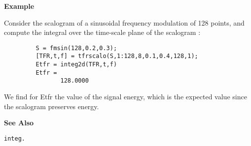 {\bf \large \sf Example}\\
\hspace*{1.5cm}
\begin{minipage}[t]{13.5cm}
Consider the scalogram of a sinusoidal frequency modulation of 128 points,
and compute the integral over the time-scale plane of the scalogram :
\begin{verbatim}
         S = fmsin(128,0.2,0.3);
         [TFR,t,f] = tfrscalo(S,1:128,8,0.1,0.4,128,1);
         Etfr = integ2d(TFR,t,f)
         Etfr = 
                128.0000
\end{verbatim}
We find for {\ty Etfr} the value of the signal energy, which is the
expected value since the scalogram preserves energy.
\end{minipage}
\vspace*{.5cm}


{\bf \large \sf See Also}\\
\hspace*{1.5cm}
\begin{minipage}[t]{13.5cm}
\begin{verbatim}
integ.
\end{verbatim}
\end{minipage}



